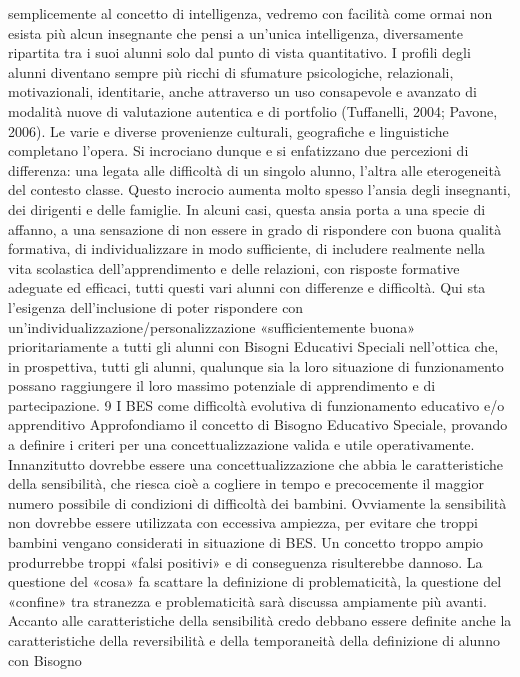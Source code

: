 semplicemente al concetto di intelligenza, vedremo con facilità come ormai non esista più alcun
insegnante che pensi a un’unica intelligenza, diversamente ripartita tra i suoi alunni solo dal punto
di vista quantitativo.
I profili degli alunni diventano sempre più ricchi di sfumature psicologiche, relazionali,
motivazionali, identitarie, anche attraverso un uso consapevole e avanzato di modalità nuove di
valutazione autentica e di portfolio (Tuffanelli, 2004; Pavone, 2006). Le varie e diverse provenienze
culturali, geografiche e linguistiche completano l’opera.
Si incrociano dunque e si enfatizzano due percezioni di differenza: una legata alle difficoltà di
un singolo alunno, l’altra alle eterogeneità del contesto classe. Questo incrocio aumenta molto
spesso l’ansia degli insegnanti, dei dirigenti e delle famiglie. In alcuni casi, questa ansia porta a una
specie di affanno, a una sensazione di non essere in grado di rispondere con buona qualità
formativa, di individualizzare in modo sufficiente, di includere realmente nella vita scolastica
dell’apprendimento e delle relazioni, con risposte formative adeguate ed efficaci, tutti questi vari
alunni con differenze e difficoltà.
Qui  sta  l’esigenza  dell’inclusione  di  poter  rispondere  con
un’individualizzazione/personalizzazione «sufficientemente buona» prioritariamente a tutti gli
alunni con Bisogni Educativi Speciali nell'ottica che, in prospettiva, tutti gli alunni, qualunque sia la
loro situazione di funzionamento possano raggiungere il loro massimo potenziale di
apprendimento e di partecipazione.
9
I BES come difficoltà evolutiva di funzionamento educativo e/o apprenditivo
Approfondiamo il concetto di Bisogno Educativo Speciale, provando a definire i criteri per una
concettualizzazione valida e utile operativamente.
Innanzitutto dovrebbe essere una concettualizzazione che abbia le caratteristiche della
sensibilità, che riesca cioè a cogliere in tempo e precocemente il maggior numero possibile di
condizioni di difficoltà dei bambini. Ovviamente la sensibilità non dovrebbe essere utilizzata con
eccessiva ampiezza, per evitare che troppi bambini vengano considerati in situazione di BES. Un
concetto troppo ampio produrrebbe troppi «falsi positivi» e di conseguenza risulterebbe dannoso.
La questione del «cosa» fa scattare la definizione di problematicità, la questione del «confine» tra
stranezza e problematicità sarà discussa ampiamente più avanti.
Accanto alle caratteristiche della sensibilità credo debbano essere definite anche la
caratteristiche della reversibilità e della temporaneità della definizione di alunno con Bisogno
